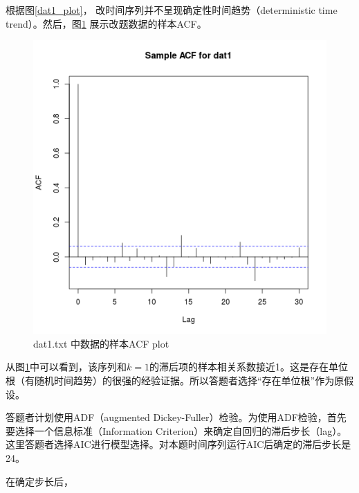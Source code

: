 \documentclass[11pt]{article}
\begin{document}
根据图\ref{dat1_plot}， 改时间序列并不呈现确定性时间趋势（deterministic time trend）。然后，图\ref{dat1_acf} 展示改题数据的样本ACF。
\begin{figure}[h]
	\centering
	\includegraphics[scale=0.4]{dat1_acf.png}
	\caption{dat1.txt 中数据的样本ACF plot}
\label{dat1_acf}
\end{figure}

从图\ref{dat1_acf}中可以看到，该序列和$k=1$的滞后项的样本相关系数接近1。这是存在单位根（有随机时间趋势）的很强的经验证据。所以答题者选择“存在单位根”作为原假设。

答题者计划使用ADF（augmented Dickey-Fuller）检验。为使用ADF检验，首先要选择一个信息标准（Information Criterion）来确定自回归的滞后步长（lag）。这里答题者选择AIC进行模型选择。对本题时间序列运行AIC后确定的滞后步长是24。

在确定步长后，






\end{document}
